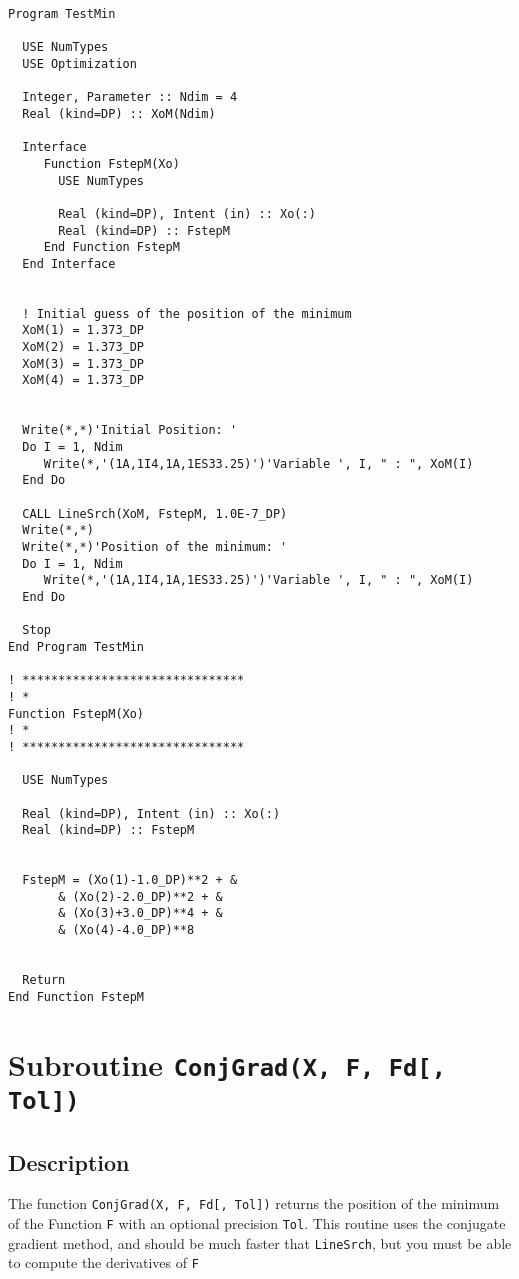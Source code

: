 \begin{lstlisting}[emph=LineSrch,
                   emphstyle=\color{blue},
                   frame=trBL,
                   caption=Minimising a function.,
                   label=linesrch]
Program TestMin

  USE NumTypes
  USE Optimization

  Integer, Parameter :: Ndim = 4
  Real (kind=DP) :: XoM(Ndim)
  
  Interface
     Function FstepM(Xo)
       USE NumTypes
       
       Real (kind=DP), Intent (in) :: Xo(:)
       Real (kind=DP) :: FstepM
     End Function FstepM
  End Interface
  

  ! Initial guess of the position of the minimum
  XoM(1) = 1.373_DP
  XoM(2) = 1.373_DP
  XoM(3) = 1.373_DP
  XoM(4) = 1.373_DP
  

  Write(*,*)'Initial Position: '
  Do I = 1, Ndim
     Write(*,'(1A,1I4,1A,1ES33.25)')'Variable ', I, " : ", XoM(I)
  End Do
  
  CALL LineSrch(XoM, FstepM, 1.0E-7_DP)
  Write(*,*)
  Write(*,*)'Position of the minimum: '
  Do I = 1, Ndim
     Write(*,'(1A,1I4,1A,1ES33.25)')'Variable ', I, " : ", XoM(I)
  End Do

  Stop
End Program TestMin

! *******************************
! *
Function FstepM(Xo)
! *
! *******************************

  USE NumTypes
  
  Real (kind=DP), Intent (in) :: Xo(:)
  Real (kind=DP) :: FstepM

  
  FstepM = (Xo(1)-1.0_DP)**2 + &
       & (Xo(2)-2.0_DP)**2 + &
       & (Xo(3)+3.0_DP)**4 + &
       & (Xo(4)-4.0_DP)**8 


  Return
End Function FstepM
\end{lstlisting}

\section{Subroutine \texttt{ConjGrad(X, F, Fd[, Tol]) }}

\subsection{Description}

The function \texttt{ConjGrad(X, F, Fd[, Tol])} returns the position of the
minimum of the Function \texttt{F} with an optional precision
\texttt{Tol}. This routine uses the conjugate gradient method, and
should be much faster that \texttt{LineSrch}, but you must be able to
compute the derivatives of \texttt{F}

